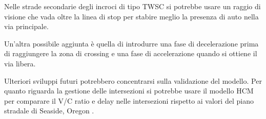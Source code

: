 Nelle strade secondarie degli incroci di tipo TWSC si potrebbe usare un raggio di visione che vada oltre la linea di stop
per stabire meglio la presenza di auto nella via principale.

Un'altra possibile aggiunta è quella di introdurre una fase di decelerazione prima di raggiungere la zona di crossing e una fase 
di accelerazione quando si ottiene il via libera.

Ulteriori sviluppi futuri potrebbero concentrarsi sulla validazione del modello. 
Per quanto riguarda la gestione delle intersezioni si potrebbe usare il modello HCM \parencite{transportation2000highway} 
per comparare il V/C ratio e delay nelle intersezioni rispetto ai valori del piano stradale di Seaside, Oregon \parencite{seaside2010tsp}.
